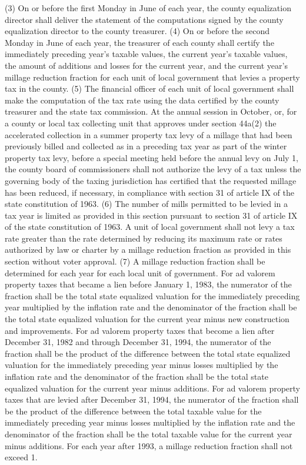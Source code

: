 \documentclass[12pt,\documentclassflag]{michiganCourtOfAppealsBrief}
\begin{document}
  (3) On or before the first Monday in June of each year, the county equalization director shall deliver the statement of the computations signed by the county equalization director to the county treasurer.
  (4) On or before the second Monday in June of each year, the treasurer of each county shall certify the immediately preceding year's taxable values, the current year's taxable values, the amount of additions and losses for the current year, and the current year's millage reduction fraction for each unit of local government that levies a property tax in the county.
  (5) The financial officer of each unit of local government shall make the computation of the tax rate using the data certified by the county treasurer and the state tax commission. At the annual session in October, or, for a county or local tax collecting unit that approves under section 44a(2) the accelerated collection in a summer property tax levy of a millage that had been previously billed and collected as in a preceding tax year as part of the winter property tax levy, before a special meeting held before the annual levy on July 1, the county board of commissioners shall not authorize the levy of a tax unless the governing body of the taxing jurisdiction has certified that the requested millage has been reduced, if necessary, in compliance with section 31 of article IX of the state constitution of 1963.
  (6) The number of mills permitted to be levied in a tax year is limited as provided in this section pursuant to section 31 of article IX of the state constitution of 1963. A unit of local government shall not levy a tax rate greater than the rate determined by reducing its maximum rate or rates authorized by law or charter by a millage reduction fraction as provided in this section without voter approval.
  (7) A millage reduction fraction shall be determined for each year for each local unit of government. For ad valorem property taxes that became a lien before January 1, 1983, the numerator of the fraction shall be the total state equalized valuation for the immediately preceding year multiplied by the inflation rate and the denominator of the fraction shall be the total state equalized valuation for the current year minus new construction and improvements. For ad valorem property taxes that become a lien after December 31, 1982 and through December 31, 1994, the numerator of the fraction shall be the product of the difference between the total state equalized valuation for the immediately preceding year minus losses multiplied by the inflation rate and the denominator of the fraction shall be the total state equalized valuation for the current year minus additions. For ad valorem property taxes that are levied after December 31, 1994, the numerator of the fraction shall be the product of the difference between the total taxable value for the immediately preceding year minus losses multiplied by the inflation rate and the denominator of the fraction shall be the total taxable value for the current year minus additions. For each year after 1993, a millage reduction fraction shall not exceed 1.
\end{document}
